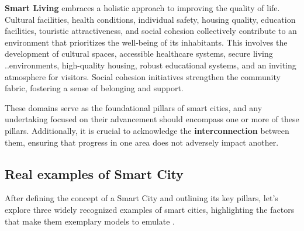   \textbf{Smart Living} embraces a holistic approach to improving the quality of life. Cultural facilities, health conditions, individual safety, housing quality, education facilities, touristic attractiveness, and social cohesion collectively contribute to an environment that prioritizes the well-being of its inhabitants.
This involves the development of cultural spaces, accessible healthcare systems, secure living ..environments, high-quality housing, robust educational systems, and an inviting atmosphere for visitors. Social cohesion initiatives strengthen the community fabric, fostering a sense of belonging and support.


These domains serve as the foundational pillars of smart cities, and any undertaking focused on their advancement should encompass one or more of these pillars. Additionally, it is crucial to acknowledge the \textbf{interconnection} between them, ensuring that progress in one area does not adversely impact another. 

\subsection{Real examples of Smart City}
\label{subsec:ExamplesOfSmartCities}
After defining the concept of a Smart City and outlining its key pillars, let's explore three widely recognized examples of smart cities, highlighting the factors that make them exemplary models to emulate \cite{foo4}.


